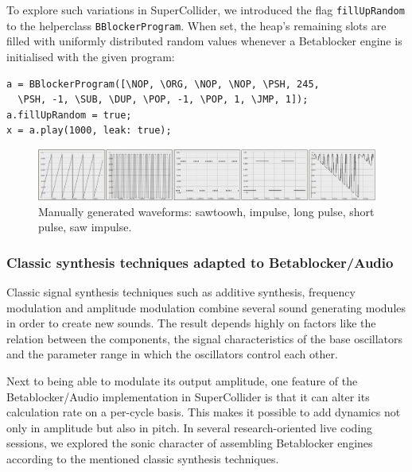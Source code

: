 \documentclass[letterpaper, 12pt]{article}
\begin{document}
To explore such variations in SuperCollider, we introduced the flag \texttt{fillUpRandom} to the helperclass \texttt{BBlockerProgram}.
When set, the heap's remaining slots are filled with uniformly distributed random values whenever a Betablocker engine is initialised with the given program:

\begin{Verbatim}[fontfamily=courier, xleftmargin=\parindent]
a = BBlockerProgram([\NOP, \ORG, \NOP, \NOP, \PSH, 245,
  \PSH, -1, \SUB, \DUP, \POP, -1, \POP, 1, \JMP, 1]);
a.fillUpRandom = true;
x = a.play(1000, leak: true);
\end{Verbatim}

\begin{figure}
	\centering
		\includegraphics[width=\columnwidth]{wv-allwaves}

	\caption{Manually generated waveforms: sawtoowh, impulse, long pulse, short pulse, saw impulse.}
	\label{fig:fig_waveforms_POPdestroy-random}
\end{figure}
\parskip 18pt

\subsubsection{Classic synthesis techniques adapted to Betablocker/Audio} %
\label{sub:classic_synthesis_techniques_adapted_to_betablocker}

Classic signal synthesis techniques such as additive synthesis, frequency modulation and amplitude modulation combine several sound generating modules in order to create new sounds.
The result depends highly on factors like the relation between the components, the signal characteristics of the base oscillators and the parameter range in which the oscillators control each other.

Next to being able to modulate its output amplitude, one feature of the Betablocker/Audio implementation in SuperCollider is that it can alter its calculation rate on a per-cycle basis.
This makes it possible to add dynamics not only in amplitude but also in pitch.
In several research-oriented live coding sessions, we explored the sonic character of assembling Betablocker engines according to the mentioned classic synthesis techniques.
\end{document}
